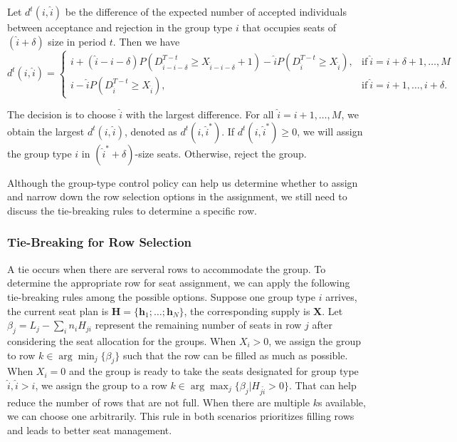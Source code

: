 Let $d^{t}({i},\hat{i})$ be the difference of the expected number of accepted individuals between acceptance and rejection in the group type ${i}$ that occupies seats of $(\hat{i}+\delta)$ size in period $t$. Then we have
\begin{equation*}
	d^{t}({i},\hat{i}) = \begin{cases}
    {i} + (\hat{i}-{i}-\delta)P(D_{\hat{i}-{i}-\delta}^{T-t} \geq X_{\hat{i}-{i}-\delta}+1) - \hat{i} P(D_{\hat{i}}^{T-t} \geq X_{\hat{i}}), &\text{if}~ \hat{i} = {i}+\delta+1, \ldots, M \\
    {i} - \hat{i} P(D_{\hat{i}}^{T-t} \geq X_{\hat{i}}), &\text{if}~ \hat{i} = {i}+1, \ldots, {i}+\delta.
		\end{cases}
\end{equation*}

The decision is to choose $\hat{i}$ with the largest difference. For all $\hat{i} = {i}+1, \ldots, M$, we obtain the largest $d^{t}({i},\hat{i})$, denoted as $d^{t}({i},\hat{i}^{*})$. If $d^{t}({i},\hat{i}^{*}) \geq 0$, we will assign the group type ${i}$ in $(\hat{i}^{*}+\delta)$-size seats. Otherwise, reject the group.

Although the group-type control policy can help us determine whether to assign and narrow down the row selection options in the assignment, we still need to discuss the tie-breaking rules to determine a specific row.

\subsubsection{Tie-Breaking for Row Selection}\label{tie-break}
A tie occurs when there are serveral rows to accommodate the group. To determine the appropriate row for seat assignment, we can apply the following tie-breaking rules among the possible options. Suppose one group type ${i}$ arrives, the current seat plan is $\bm{H} = \{\bm{h}_{1}; \ldots; \bm{h}_{N}\}$, the corresponding supply is $\bm{X}$. Let $\beta_{j} = L_j - \sum_{i} n_{i} H_{ji}$ represent the remaining number of seats in row $j$ after considering the seat allocation for the groups. When $X_{i} > 0$, we assign the group to row $k \in \arg \min_{j} \{\beta_{j}\}$ such that the row can be filled as much as possible. When $X_{i} = 0$ and the group is ready to take the seats designated for group type $\hat{i}, \hat{i}>i$, we assign the group to a row $k \in \arg \max_{j} \{\beta_{j}| H_{j \hat{i}}>0\}$. That can help reduce the number of rows that are not full. When there are multiple $k$s available, we can choose one arbitrarily. This rule in both scenarios prioritizes filling rows and leads to better seat management.

